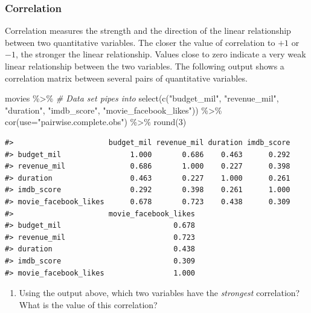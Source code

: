 \documentclass[
]{report}
\newenvironment{Shaded}{\begin{snugshade}}{\end{snugshade}}
\newcommand{\AttributeTok}[1]{\textcolor[rgb]{0.77,0.63,0.00}{#1}}
\newcommand{\CommentTok}[1]{\textcolor[rgb]{0.56,0.35,0.01}{\textit{#1}}}
\newcommand{\DecValTok}[1]{\textcolor[rgb]{0.00,0.00,0.81}{#1}}
\newcommand{\FunctionTok}[1]{\textcolor[rgb]{0.00,0.00,0.00}{#1}}
\newcommand{\NormalTok}[1]{#1}
\newcommand{\SpecialCharTok}[1]{\textcolor[rgb]{0.00,0.00,0.00}{#1}}
\newcommand{\StringTok}[1]{\textcolor[rgb]{0.31,0.60,0.02}{#1}}
\providecommand{\tightlist}{%
  \setlength{\itemsep}{0pt}\setlength{\parskip}{0pt}}
\begin{document}
\hypertarget{correlation}{%
\subsubsection*{Correlation}\label{correlation}}

Correlation measures the strength and the direction of the linear relationship between two quantitative variables. The closer the value of correlation to \(+1\) or \(-1\), the stronger the linear relationship. Values close to zero indicate a very weak linear relationship between the two variables. The following output shows a correlation matrix between several pairs of quantitative variables.

\begin{Shaded}
\begin{Highlighting}[]
\NormalTok{movies }\SpecialCharTok{\%\textgreater{}\%}  \CommentTok{\# Data set pipes into}
  \FunctionTok{select}\NormalTok{(}\FunctionTok{c}\NormalTok{(}\StringTok{"budget\_mil"}\NormalTok{, }\StringTok{"revenue\_mil"}\NormalTok{, }
           \StringTok{"duration"}\NormalTok{, }\StringTok{"imdb\_score"}\NormalTok{, }
           \StringTok{"movie\_facebook\_likes"}\NormalTok{)) }\SpecialCharTok{\%\textgreater{}\%}
  \FunctionTok{cor}\NormalTok{(}\AttributeTok{use=}\StringTok{"pairwise.complete.obs"}\NormalTok{) }\SpecialCharTok{\%\textgreater{}\%}
  \FunctionTok{round}\NormalTok{(}\DecValTok{3}\NormalTok{)}
\end{Highlighting}
\end{Shaded}

\begin{verbatim}
#>                      budget_mil revenue_mil duration imdb_score
#> budget_mil                1.000       0.686    0.463      0.292
#> revenue_mil               0.686       1.000    0.227      0.398
#> duration                  0.463       0.227    1.000      0.261
#> imdb_score                0.292       0.398    0.261      1.000
#> movie_facebook_likes      0.678       0.723    0.438      0.309
#>                      movie_facebook_likes
#> budget_mil                          0.678
#> revenue_mil                         0.723
#> duration                            0.438
#> imdb_score                          0.309
#> movie_facebook_likes                1.000
\end{verbatim}

\begin{enumerate}
\def\labelenumi{\arabic{enumi}.}
\tightlist
\item
  Using the output above, which two variables have the \emph{strongest} correlation? What is the value of this correlation?
\end{enumerate}
\end{document}
